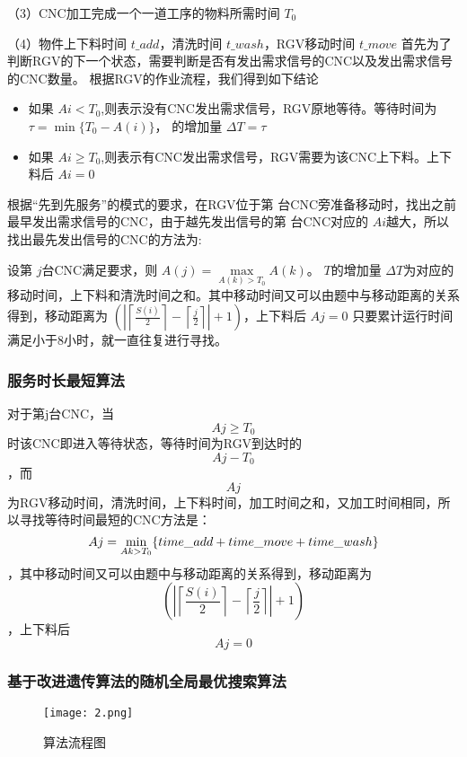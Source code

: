 \documentclass[withoutpreface,bwprint]{cumcmthesis} %
\begin{document}
（3）CNC加工完成一个一道工序的物料所需时间  ${T_0}$

（4）物件上下料时间  $t\_add$，清洗时间  $t\_wash$，RGV移动时间  $t\_move$
首先为了判断RGV的下一个状态，需要判断是否有发出需求信号的CNC以及发出需求信号的CNC数量。
根据RGV的作业流程，我们得到如下结论
\begin{itemize}
	\item 如果  $Ai < {T_0}$,则表示没有CNC发出需求信号，RGV原地等待。等待时间为  $\tau  = \min \{ {T_0} - A(i)\} $， 的增加量  $\Delta T = \tau $
	\item 如果  $Ai \ge {T_0}$,则表示有CNC发出需求信号，RGV需要为该CNC上下料。上下料后  $Ai = 0$
\end{itemize}

根据“先到先服务”的模式的要求，在RGV位于第 台CNC旁准备移动时，找出之前最早发出需求信号的CNC，由于越先发出信号的第 台CNC对应的  $Ai$越大，所以找出最先发出信号的CNC的方法为:

设第  $j$台CNC满足要求，则  $A(j) = \mathop {\max }\limits_{A(k) > {T_0}} A(k)$。  $T$的增加量  $\Delta T$为对应的移动时间，上下料和清洗时间之和。其中移动时间又可以由题中与移动距离的关系得到，移动距离为  $(\left| {\left\lceil {\frac{{S(i)}}{2}} \right\rceil  - \left\lceil {\frac{j}{2}} \right\rceil } \right| + 1)$，上下料后  $Aj = 0$
只要累计运行时间 满足小于8小时，就一直往复进行寻找。



\subsubsection{服务时长最短算法}

对于第j台CNC，当  \[Aj \ge {T_0}\]时该CNC即进入等待状态，等待时间为RGV到达时的  \[Aj - {T_0}\]，而  \[Aj\]为RGV移动时间，清洗时间，上下料时间，加工时间之和，又加工时间相同，所以寻找等待时间最短的CNC方法是：  \[Aj = \mathop {\min }\limits_{Ak > {T_0}} \{ {\rm{ }}time\_add + time\_move + time\_wash\} \]，其中移动时间又可以由题中与移动距离的关系得到，移动距离为  \[(\left| {\left\lceil {\frac{{S(i)}}{2}} \right\rceil  - \left\lceil {\frac{j}{2}} \right\rceil } \right| + 1)\]，上下料后  \[Aj = 0\]



\subsubsection{基于改进遗传算法的随机全局最优搜索算法}

\begin{figure}[!h]
\centering
\texttt{[image: 2.png]}
\caption{算法流程图}
\end{figure}
\end{document}

